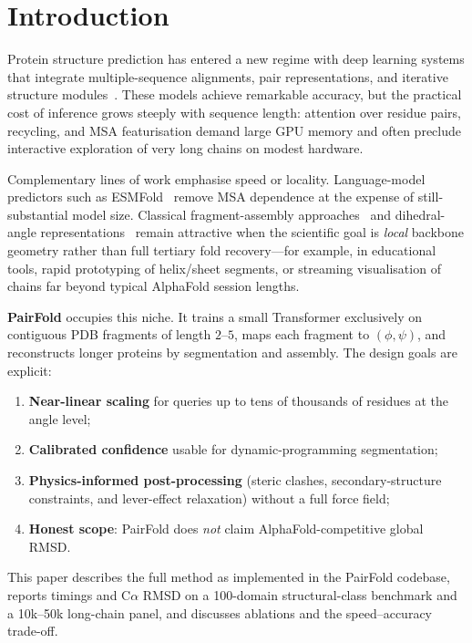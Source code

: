 \documentclass[11pt,a4paper]{article}
\begin{document}
\section{Introduction}

Protein structure prediction has entered a new regime with deep learning systems that integrate multiple-sequence alignments, pair representations, and iterative structure modules~\citep{jumper2021alphafold,senior2020alphafold}.
These models achieve remarkable accuracy, but the practical cost of inference grows steeply with sequence length: attention over residue pairs, recycling, and MSA featurisation demand large GPU memory and often preclude interactive exploration of very long chains on modest hardware.

Complementary lines of work emphasise speed or locality.
Language-model predictors such as ESMFold~\citep{lin2023evolutionary} remove MSA dependence at the expense of still-substantial model size.
Classical fragment-assembly approaches~\citep{simons1997assembly,rohl2004rosetta} and dihedral-angle representations~\citep{ramachandran1963stereochemistry} remain attractive when the scientific goal is \emph{local} backbone geometry rather than full tertiary fold recovery---for example, in educational tools, rapid prototyping of helix/sheet segments, or streaming visualisation of chains far beyond typical AlphaFold session lengths.

\textbf{PairFold} occupies this niche.
It trains a small Transformer exclusively on contiguous PDB fragments of length $2$--$5$, maps each fragment to $(\phi,\psi)$, and reconstructs longer proteins by segmentation and assembly.
The design goals are explicit:
\begin{enumerate}[leftmargin=1.5em,itemsep=0.25em]
  \item \textbf{Near-linear scaling} for queries up to tens of thousands of residues at the angle level;
  \item \textbf{Calibrated confidence} usable for dynamic-programming segmentation;
  \item \textbf{Physics-informed post-processing} (steric clashes, secondary-structure constraints, and lever-effect relaxation) without a full force field;
  \item \textbf{Honest scope}: PairFold does \emph{not} claim AlphaFold-competitive global RMSD.
\end{enumerate}

This paper describes the full method as implemented in the PairFold codebase, reports timings and C$\alpha$ RMSD on a 100-domain structural-class benchmark and a 10k--50k long-chain panel, and discusses ablations and the speed--accuracy trade-off.
\end{document}
